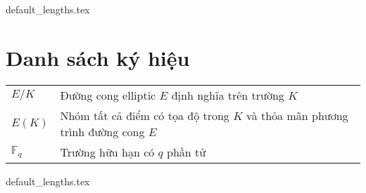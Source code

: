 \documentclass[class=report, crop=false]{standalone}
\begin{document}
	{default_lengths.tex}
	\baselineskip
	\chapter*{Danh sách ký hiệu}
	\begin{tabu}{>{\large\bfseries}m{2cm} >{\large}X[l]}
		$E/K$				&	Đường cong elliptic $E$ định nghĩa trên trường $K$ \\
		$E(K)$				&	Nhóm tất cả điểm có tọa độ trong $K$ và thỏa mãn phương trình đường cong $E$ \\
		$\mathbb{F}_q$		&	Trường hữu hạn có $q$ phần tử \\

	\end{tabu}
	\newpage
	{default_lengths.tex}
\end{document}

